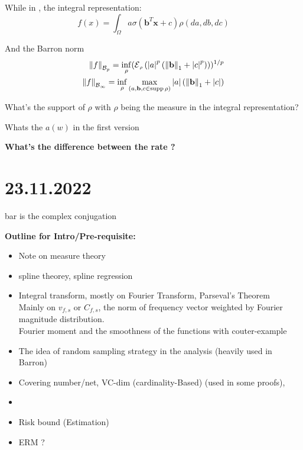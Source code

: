 While in \cite{eBarronSpaceFlowinduced2021}, the integral representation:
\begin{equation*}
    f(x) = \int_{\Omega} a \sigma(\mathbf{b}^T\mathbf{x} + c) \rho(da, db, dc)
\end{equation*}

And the Barron norm
\begin{align*}
    \barronnorm{f}{p} = \inf_{\rho} (\ERWi{\rho}{\abs{a}^p(\norm{\mathbf{b}}_1 + \abs{c}^p)})^{1/p} \\
    \barronnorm{f}{\infty} = \inf_{\rho} \max_{(a,\mathbf{b},c \in \supp{\rho})} \abs{a}(\norm{\mathbf{b}}_1 + \abs{c})
\end{align*}

What's the support of $\rho$ with $\rho$ being the measure in the integral representation?

Whats the $a(w)$ in the first version

\textbf{What's the difference between the rate ?}

\textbf{\cite{parhiRoleNeuralNetwork2020}}

\textbf{\cite{heissHowImplicitRegularization2021}}

\newpage

\section{23.11.2022}

{\small bar is the complex conjugation}

\textbf{Outline for Intro/Pre-requisite:}
\begin{itemize}
    \item Note on measure theory
    \item spline theorey, spline regression
    \item Integral transform, mostly on Fourier Transform, Parseval’s Theorem \\
    Mainly on $v_{f,s}$ or $C_{f,s}$, the norm of frequency vector weighted by Fourier magnitude distribution. \\
    Fourier moment and the smoothness of the functions with couter-example
    \item The idea of random sampling strategy in the analysis (heavily used in Barron)
    \item Covering number/net, VC-dim (cardinality-Based) (used in some proofs),
    \item {}
    \item Risk bound (Estimation)
    \item ERM ?
\end{itemize}


